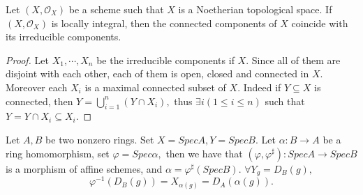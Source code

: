 \begin{cor}
Let $(X, \mathcal {O}_X)$ be a scheme such that $X$ is a Noetherian
topological space. If $(X, \mathcal {O}_X)$ is locally integral,
then the connected components of $X$ coincide with its irreducible
components.
\end{cor}
\begin{proof}
Let $X_1,\cdots,X_n$ be the irreducible components if $X.$ Since all
of them are disjoint with each other, each of them is open, closed
and connected in $X.$ Moreover each $X_i$ is a maximal connected
subset of $X.$ Indeed if $Y\subseteq X$ is connected, then
$Y=\bigcup\limits_{i=1}^n(Y\cap X_i),$ thus $\exists i(1\leqslant
i\leqslant n)$ such that $Y=Y\cap X_i\subseteq X_i.$
\end{proof}
\begin{remark}
Let $A,B$ be two nonzero rings. Set $X=SpecA, Y=SpecB.$ Let $\alpha:
B\rightarrow A$ be a ring homomorphism, set $\varphi=Spec\alpha,$
then we have that $(\varphi,\varphi^{\sharp}): SpecA\rightarrow
SpecB$ is a morphism of affine schemes, and
$\alpha=\varphi^{\sharp}(SpecB).$ $\forall Y_g=D_B(g),$
$$\varphi^{-1}(D_B(g))=X_{\alpha(g)}=D_A(\alpha(g)).$$
\end{remark}

